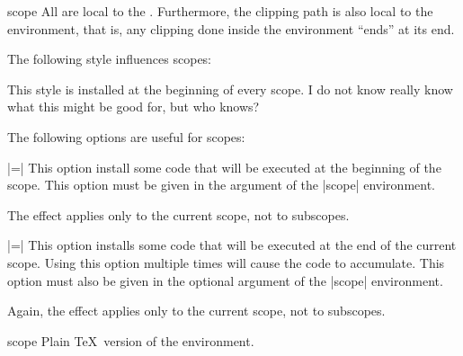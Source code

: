 \begin{environment}{{scope}}
  All  are local to the . Furthermore, the clipping path is also local to the
  environment, that is, any clipping done inside the environment
  ``ends'' at its end.

\begin{codeexample}[]
\begin{tikzpicture}
  \begin{scope}[red]
    \draw (0mm,0mm) -- (10mm,0mm);
    \draw (0mm,1mm) -- (10mm,1mm);
  \end{scope}
  \draw (0mm,2mm) -- (10mm,2mm);
  \begin{scope}[green]
    \draw (0mm,3mm) -- (10mm,3mm);
    \draw (0mm,4mm) -- (10mm,4mm);
    \draw[blue] (0mm,5mm) -- (10mm,5mm);
  \end{scope}
\end{tikzpicture}
\end{codeexample}
  
  The following style influences scopes:
  \begin{itemize}
    This style is installed at the beginning of every scope. I do not
    know really know what this might be good for, but who knows?
  \end{itemize}

  The following options are useful for scopes:
  \begin{itemize}
    |=|
    This option install some code that will be executed
    at the beginning of the scope. This option must be
    given in the argument of the |{scope}| environment.

    The effect applies only to the current scope, not to subscopes.

    |=|
    This option installs some code that will be executed
    at the end of the  current scope. Using this option multiple times
    will  cause the code to accumulate. This option must also be given
    in the optional argument of the |{scope}| environment. 

    Again, the effect applies only to the current scope, not to subscopes.
  \end{itemize}
\end{environment}

\begin{plainenvironment}{{scope}}
  Plain \TeX\ version of the environment.
\end{plainenvironment}

